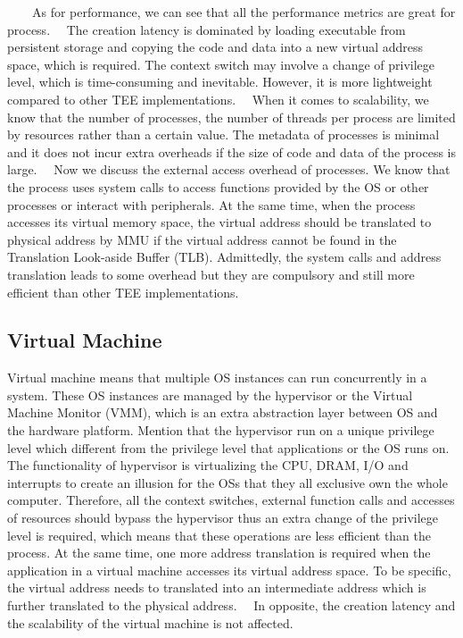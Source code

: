 \documentclass[12pt,twoside]{report}
\begin{document}
\ \ \ \ As for performance, we can see that all the performance metrics are great for process. \ \ The creation latency is dominated by loading executable from persistent storage and copying the code and data into a new virtual address space, which is required. The context switch may involve a change of privilege level, which is time-consuming and inevitable. However, it is more lightweight compared to other TEE implementations. \ \ When it comes to scalability, we know that the number of processes, the number of threads per process are limited by resources rather than a certain value. The metadata of processes is minimal and it does not incur extra overheads if the size of code and data of the process is large. \ \ Now we discuss the external access overhead of processes. We know that the process uses system calls to access functions provided by the OS or other processes or interact with peripherals. At the same time, when the process accesses its virtual memory space, the virtual address should be translated to physical address by MMU if the virtual address cannot be found in the Translation Look-aside Buffer (TLB). Admittedly, the system calls and address translation leads to some overhead but they are compulsory and still more efficient than other TEE implementations.

\subsection{Virtual Machine}

Virtual machine means that multiple OS instances can run concurrently in a system. These OS instances are managed by the hypervisor or the Virtual Machine Monitor (VMM), which is an extra abstraction layer between OS and the hardware platform. Mention that the hypervisor run on a unique privilege level which different from the privilege level that applications or the OS runs on. The functionality of hypervisor is virtualizing the CPU, DRAM, I/O and interrupts to create an illusion for the OSs that they all exclusive own the whole computer. Therefore, all the context switches, external function calls and accesses of resources should bypass the hypervisor thus an extra change of the privilege level is required, which means that these operations are less efficient than the process. At the same time, one more address translation is required when the application in a virtual machine accesses its virtual address space. To be specific, the virtual address needs to translated into an intermediate address which is further translated to the physical address. \ \ In opposite, the creation latency and the scalability of the virtual machine is not affected.
\end{document}
